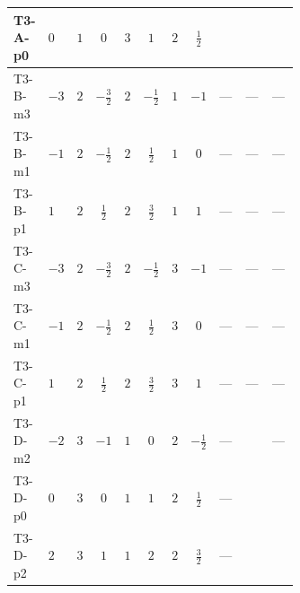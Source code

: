 \documentclass[8pt]{article}
\begin{document}
\begin{landscape}
\begin{longtable}{@{}llcccccc >{\raggedright\arraybackslash}p{0.21\linewidth} >{\raggedright\arraybackslash}p{0.21\linewidth} >{\raggedright\arraybackslash}p{0.21\linewidth}@{}}
\midrule
T3-A-p0 & $0$ & $1$ & $0$ & $3$ & $1$ & $2$ & $\frac{1}{2}$ & \scriptsize\adjustbox{max width=\linewidth}{$\begin{gathered} +6 {g_2}^4\end{gathered}$} & \scriptsize\adjustbox{max width=\linewidth}{$\begin{gathered} -\frac{33 {g_2}^2 {\lambda_{HS_2}^{(1)}}}{2}\end{gathered}$} & \scriptsize\adjustbox{max width=\linewidth}{$\begin{gathered} +3 {g_1}^4\end{gathered}$} \\
\midrule
T3-B-m3 & $-3$ & $2$ & $-\frac{3}{2}$ & $2$ & $-\frac{1}{2}$ & $1$ & $-1$ & --- & --- & --- \\
\midrule
T3-B-m1 & $-1$ & $2$ & $-\frac{1}{2}$ & $2$ & $\frac{1}{2}$ & $1$ & $0$ & --- & --- & --- \\
\midrule
T3-B-p1 & $1$ & $2$ & $\frac{1}{2}$ & $2$ & $\frac{3}{2}$ & $1$ & $1$ & --- & --- & --- \\
\midrule
T3-C-m3 & $-3$ & $2$ & $-\frac{3}{2}$ & $2$ & $-\frac{1}{2}$ & $3$ & $-1$ & --- & --- & --- \\
\midrule
T3-C-m1 & $-1$ & $2$ & $-\frac{1}{2}$ & $2$ & $\frac{1}{2}$ & $3$ & $0$ & --- & --- & --- \\
\midrule
T3-C-p1 & $1$ & $2$ & $\frac{1}{2}$ & $2$ & $\frac{3}{2}$ & $3$ & $1$ & --- & --- & --- \\
\midrule
T3-D-m2 & $-2$ & $3$ & $-1$ & $1$ & $0$ & $2$ & $-\frac{1}{2}$ & --- & \scriptsize\adjustbox{max width=\linewidth}{$\begin{gathered} -\frac{9 {g_2}^2 {\lambda_{HS_2}^{(1)}}}{2}\end{gathered}$} & --- \\
\midrule
T3-D-p0 & $0$ & $3$ & $0$ & $1$ & $1$ & $2$ & $\frac{1}{2}$ & --- & \scriptsize\adjustbox{max width=\linewidth}{$\begin{gathered} -\frac{9 {g_2}^2 {\lambda_{HS_2}^{(1)}}}{2}\end{gathered}$} & \scriptsize\adjustbox{max width=\linewidth}{$\begin{gathered} +3 {g_1}^4\end{gathered}$} \\
\midrule
T3-D-p2 & $2$ & $3$ & $1$ & $1$ & $2$ & $2$ & $\frac{3}{2}$ & --- & \scriptsize\adjustbox{max width=\linewidth}{$\begin{gathered} -\frac{9 {g_2}^2 {\lambda_{HS_2}^{(1)}}}{2}\end{gathered}$} & \scriptsize\adjustbox{max width=\linewidth}{$\begin{gathered} +12 {g_1}^4\end{gathered}$} \\

\end{longtable}
\end{landscape}
\end{document}
